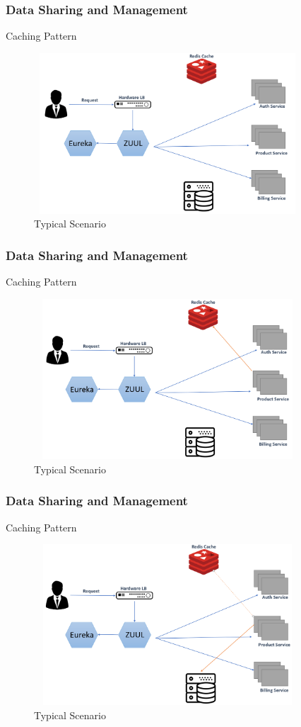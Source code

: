 \documentclass{beamer}
\begin{document}
	\begin{frame}
		\frametitle{Data Sharing and Management}
		Caching Pattern
			\begin{figure}[h]
				\includegraphics[width=100mm,height= 60mm, scale=1]{img/flow-1.PNG}
				\caption{Typical Scenario}
		\end{figure}
	\end{frame}

	\begin{frame}
		\frametitle{Data Sharing and Management}
		Caching Pattern
		\begin{figure}[h]
			\includegraphics[width=100mm,height= 60mm, scale=1]{img/flow-2.PNG}
			\caption{Typical Scenario}
		\end{figure}
	\end{frame}

	\begin{frame}
		\frametitle{Data Sharing and Management}
		Caching Pattern
		\begin{figure}[h]
			\includegraphics[width=100mm,height= 60mm, scale=1]{img/flow-3.PNG}
			\caption{Typical Scenario}
		\end{figure}
	\end{frame}
\end{document}
